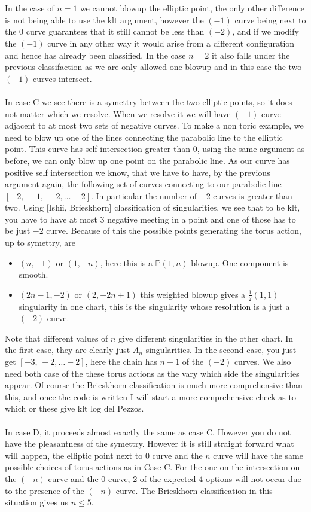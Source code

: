 \documentclass[11pt]{amsart}
\theoremstyle{definition}
\theoremstyle{definition}
\theoremstyle{definition}
\theoremstyle{definition}
\theoremstyle{definition}
\theoremstyle{definition}
\theoremstyle{definition}
\begin{document}
\\
\\
In the case of $n=1$ we cannot blowup the elliptic point, the only other difference is not being able to use the klt argument, however the $(-1)$ curve being next to the 0 curve guarantees that it still cannot be less than $(-2)$, and if we modify the $(-1)$ curve in any other way it would arise from a different configuration and hence has already been classified. In the case $n = 2$ it also falls under the previous classifaction as we are only allowed one blowup and in this case the two $(-1)$ curves intersect.
\\
\\
In case C we see there is a symettry between the two elliptic points, so it does not matter which we resolve. When we resolve it we will have $(-1)$ curve adjacent to at most two sets of negative curves. To make a non toric example, we need to blow up one of the lines connecting the parabolic line to the elliptic point. This curve has self intersection greater than 0, using the same argument as before, we can only blow up one point on the parabolic line. As our curve has positive self intersection we know, that we have to have, by the previous argument again, the following set of curves connecting to our parabolic line $[-2, \, -1, \,  -2, \dots -2 ]$. In particular the number of $-2$ curves is greater than two. Using [Ishii, Brieskhorn] classification of singularities, we see that to be klt, you have to have at most 3 negative meeting in a point and one of those has to be just $-2$ curve. Because of this the possible points generating the torus action, up to symettry, are 
\\
\begin{itemize}
\item $(n, -1)$ or $(1, -n)$, here this is a $\mathbb{P}(1, n)$ blowup. One component is smooth.
\item $(2n - 1, -2)$ or $(2, -2n+1)$ this weighted blowup gives a $\frac{1}{2}(1,1)$ singularity in one chart, this is the singularity whose resolution is a just a $(-2)$ curve. 
\end{itemize}
Note that different values of $n$ give different singularities in the other chart. In the first case, they are clearly just $A_n$ singularities. In the second case, you just get $[-3, \, -2, \dots -2]$, here the chain has $n-1$ of the $(-2)$ curves. We also need both case of the these torus actions as the vary which side the singularities appear. Of course the Brieskhorn classification is much more comprehensive than this, and once the code is written I will start a more comprehensive check as to which or these give klt log del Pezzos. 
\\
\\
In case D, it proceeds almost exactly the same as case C. However you do not have the pleasantness of the symettry. However it is still straight forward what will happen, the elliptic point next to $0$ curve and the $n$ curve will have the same possible choices of torus actions as in Case C. For the one on the intersection on the $(-n)$ curve and the 0 curve, 2 of the expected 4 options will not occur due to the presence of the $(-n)$ curve. The Brieskhorn classification in this situation gives us $n \leq 5$.
\end{document}
